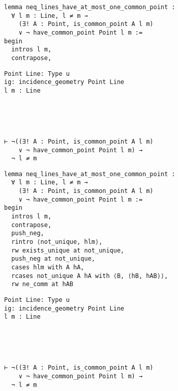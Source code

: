 \begin{frame}[fragile]
	\begin{multicols}{2}
		\begin{lstlisting}
lemma neq_lines_have_at_most_one_common_point :
  ∀ l m : Line, l ≠ m → 
    (∃! A : Point, is_common_point A l m) 
    ∨ ¬ have_common_point Point l m := 
begin
  intros l m,
  contrapose,
\end{lstlisting}
		\columnbreak
		\begin{lstlisting}
Point Line: Type u
ig: incidence_geometry Point Line
l m : Line





⊢ ¬((∃! A : Point, is_common_point A l m) 
    ∨ ¬ have_common_point Point l m) → 
  ¬ l ≠ m
		\end{lstlisting}
	\end{multicols}
\end{frame}










\begin{frame}[fragile]
	\begin{multicols}{2}
		\begin{lstlisting}
lemma neq_lines_have_at_most_one_common_point :
  ∀ l m : Line, l ≠ m → 
    (∃! A : Point, is_common_point A l m) 
    ∨ ¬ have_common_point Point l m := 
begin
  intros l m,
  contrapose,
  push_neg,
  rintro ⟨not_unique, hlm⟩,
  rw exists_unique at not_unique,
  push_neg at not_unique,
  cases hlm with A hA,
  rcases not_unique A hA with ⟨B, ⟨hB, hAB⟩⟩,
  rw ne_comm at hAB
\end{lstlisting}
		\columnbreak
		\begin{lstlisting}
Point Line: Type u
ig: incidence_geometry Point Line
l m : Line





⊢ ¬((∃! A : Point, is_common_point A l m) 
    ∨ ¬ have_common_point Point l m) → 
  ¬ l ≠ m
\end{lstlisting}
	\end{multicols}
\end{frame}










